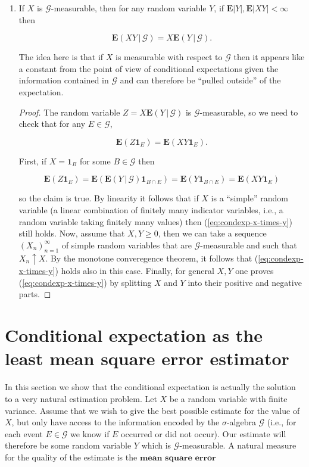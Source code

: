 \begin{enumerate}[label=\arabic*.]
\begin{xexercise}
Prove this.
\end{xexercise}

\item If $X$ is $\mathcal{G}$-measurable, then for any
random variable $Y$, if
$\mathbf{E}|Y|, \mathbf{E}|XY|<\infty$ then

\[
\mathbf{E}\left(XY\,|\,\mathcal{G}\right) = X \mathbf{E}\left(Y\,|\,\mathcal{G}\right).
\]

\noindent The idea here is that if $X$ is measurable with
respect to $\mathcal{G}$ then it appears like a
constant from the point of view of conditional
expectations given the information contained in
$\mathcal{G}$ and can therefore be ``pulled outside''
of the expectation.

\begin{proof}
The random variable
$Z=X\mathbf{E}\left(Y\,|\,\mathcal{G}\right)$ is
$\mathcal{G}$-measurable, so we need to check that
for any $E\in \mathcal{G}$,

\begin{equation*} \tag{7}\label{eq:condexp-x-times-y}
\mathbf{E}(Z\mathbf{1}_E) = \mathbf{E}(XY \mathbf{1}_E).
\end{equation*}

\noindent First, if $X=\mathbf{1}_B$ for some $B\in\mathcal{G}$
then

\[
\mathbf{E}(Z \mathbf{1}_E) = \mathbf{E}(\mathbf{E}\left(Y\,|\,\mathcal{G}\right)\mathbf{1}_{B\cap E}) = \mathbf{E}(Y\mathbf{1}_{B\cap E})
= \mathbf{E}(XY \mathbf{1}_E)
\]

\noindent so the claim is true. By linearity it follows that if
$X$ is a ``simple'' random variable (a linear
combination of finitely many indicator variables,
i.e., a random variable taking finitely many values)
then (\ref{eq:condexp-x-times-y}) still holds. Now, assume
that $X,Y\ge 0$, then we can take a sequence
$(X_n)_{n=1}^\infty$ of simple random variables that
are $\mathcal{G}$-measurable and such that
$X_n\uparrow X$. By the monotone converegence
theorem, it follows that (\ref{eq:condexp-x-times-y})
holds also in this case. Finally, for general $X,Y$
one proves (\ref{eq:condexp-x-times-y}) by splitting $X$
and $Y$ into their positive and negative parts.
\end{proof}
\end{enumerate}

\section{Conditional expectation as the least mean square error estimator}
In this section we show that the conditional
expectation is actually the solution to a very natural
estimation problem. Let $X$ be a random variable with
finite variance. Assume that we wish to give the best
possible estimate for the value of $X$, but only have
access to the information encoded by the
$\sigma$-algebra $\mathcal{G}$ (i.e., for each event
$E\in\mathcal{G}$ we know if $E$ occurred or did not
occur). Our estimate will therefore be some random
variable $Y$ which is $\mathcal{G}$-measurable. A
natural measure for the quality of the estimate is the
$\textbf{mean square error}$

